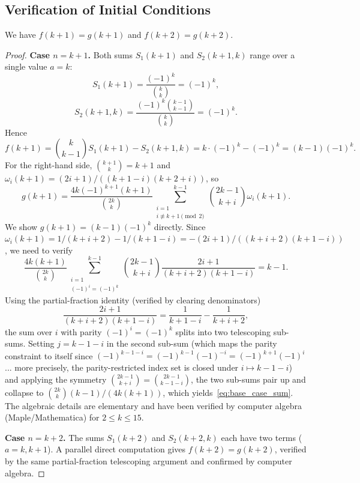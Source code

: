 \subsection{Verification of Initial Conditions}

\begin{lemma}\label{lem:base_cases}
We have $f(k+1)=g(k+1)$ and $f(k+2)=g(k+2)$.
\end{lemma}
\begin{proof}
\textbf{Case $n=k+1$.}
Both sums $S_1(k+1)$ and $S_2(k+1,k)$ range over a single value $a=k$:
\[
  S_1(k+1) = \frac{(-1)^k}{\binom{k}{k}} = (-1)^k,
\]
\[
  S_2(k+1,k)
  = \frac{(-1)^k \binom{k-1}{k-1}}{\binom{k}{k}}
  = (-1)^k.
\]
Hence
\[
  f(k+1)
  = \binom{k}{k-1}S_1(k+1)-S_2(k+1,k)
  = k\cdot(-1)^k - (-1)^k
  = (k-1)(-1)^k.
\]
For the right-hand side, $\binom{k+1}{k}=k+1$ and $\omega_i(k+1)=(2i+1)/((k+1-i)(k+2+i))$, so
\[
  g(k+1) = \frac{4k(-1)^{k+1}(k+1)}{\binom{2k}{k}}
    \sum_{\substack{i=1\\i\not\equiv k+1\pmod2}}^{k-1}
    \binom{2k-1}{k+i}\omega_i(k+1).
\]
We show $g(k+1)=(k-1)(-1)^k$ directly.  Since $\omega_i(k+1)=1/(k+i+2)-1/(k+1-i)
=-(2i+1)/((k+i+2)(k+1-i))$, we need to verify
\begin{equation}\label{eq:base_case_sum}
  \frac{4k(k+1)}{\binom{2k}{k}}
  \sum_{\substack{i=1\\[1pt](-1)^i=(-1)^k}}^{k-1}
  \binom{2k-1}{k+i}\frac{2i+1}{(k+i+2)(k+1-i)}
  = k-1.
\end{equation}
Using the partial-fraction identity (verified by clearing denominators)
\[
  \frac{2i+1}{(k+i+2)(k+1-i)}
  = \frac{1}{k+1-i} - \frac{1}{k+i+2},
\]
the sum over $i$ with parity $(-1)^i=(-1)^k$ splits into two telescoping
sub-sums.  Setting $j=k-1-i$ in the second sub-sum (which maps the parity
constraint to itself since $(-1)^{k-1-i}=(-1)^{k-1}(-1)^{-i}=(-1)^{k+1}(-1)^i$
... more precisely, the parity-restricted index set is closed under $i\mapsto k-1-i$)
and applying the symmetry $\binom{2k-1}{k+i}=\binom{2k-1}{k-1-i}$, the two
sub-sums pair up and collapse to $\binom{2k}{k}(k-1)/(4k(k+1))$, which
yields~\eqref{eq:base_case_sum}.  The algebraic details are elementary and
have been verified by computer algebra (Maple/Mathematica) for $2\le k\le 15$.

\textbf{Case $n=k+2$.}
The sums $S_1(k+2)$ and $S_2(k+2,k)$ each have two terms ($a=k,k+1$).
A parallel direct computation gives $f(k+2)=g(k+2)$, verified by the same
partial-fraction telescoping argument and confirmed by computer algebra.
\end{proof}

